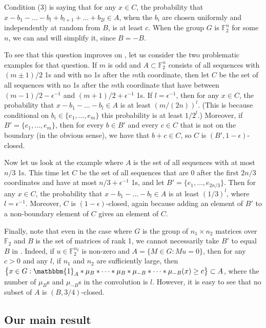 \documentclass{toc}
\newcommand\eps{\epsilon}  %
\newcommand\F{\mathbb{F}}
\newcommand{\ind}{\mathbbm{1}}
\renewcommand\AA{\ind_A}
\newcommand \s{\subset}
\begin{document}
\noindent Condition (3) is saying that for any $x\in C$, the probability that $x-b_1-\dots-b_l+b_{l+1}+\dots+b_{2l}\in A$, when the $b_i$ are chosen uniformly and independently at random from $B$, is at least $c$. When the group $G$ is $\F_2^n$ for some $n$, we can and will simplify it, since $B=-B$.

To see that this question improves on , let us consider the two problematic examples for that question. If $m$ is odd and $A\subset\F_2^n$ consists of all sequences with $(m\pm 1)/2$ 1s and with no 1s after the $m$th coordinate, then let $C$ be the set of all sequences with no 1s after the $m$th coordinate that have between $(m-1)/2-\eps^{-1}$ and $(m+1)/2+\eps^{-1}$ 1s. If $l=\eps^{-1}$, then for any $x\in C$, the probability that $x-b_1-\dots-b_l\in A$ is at least $({m}/{(2n)})^l$. (This is because conditional on $b_i\in \{e_1,\dots,e_m\}$ this probability is at least ${1}/{2^l}$.) Moreover, if $B'=\{e_1,\dots,e_m\}$, then for every $b\in B'$ and every $c\in C$ that is not on the boundary (in the obvious sense), we have that $b+c\in C$, so $C$ is  $(B',1-\eps)$-closed.

Now let us look at the example where $A$ is the set of all sequences with at most $n/3$ 1s. This time let $C$ be the set of all sequences that are 0 after the first $2n/3$ coordinates and have at most $n/3+\eps^{-1}$ 1s, and let $B'=\{e_1,\dots,e_{2n/3}\}$. Then for any $x\in C$, the probability that $x-b_1-\dots-b_l\in A$ is at least $({1}/{3})^l$, where $l=\eps^{-1}$. Moreover, $C$ is  $(1-\eps)$-closed, again because adding an element of $B'$ to a non-boundary element of $C$ gives an element of $C$.

%
Finally, note that even in the case where $G$ is the group of $n_1\times n_2$ matrices over $\F_2$ and $B$ is the set of matrices of rank 1, we cannot necessarily take $B'$ to equal $B$ in . Indeed, if $u\in \F_2^{n_2}$ is non-zero and $A=\{M\in G: Mu=0\}$, then for any $c>0$ and any $l$, if $n_1$ and $n_2$ are sufficiently large, then $\bigl\{x\in G: \AA*\mu_B*\dots*\mu_B*\mu_{-B}*\dots*\mu_{-B}(x)\geq c\bigr\}\s A$, where the number of $\mu_B$s and $\mu_{-B}$s in the convolution is $l$. However, it is easy to see that no subset of $A$ is $(B,3/4)$-closed.

\subsection{Our main result}
\end{document}
